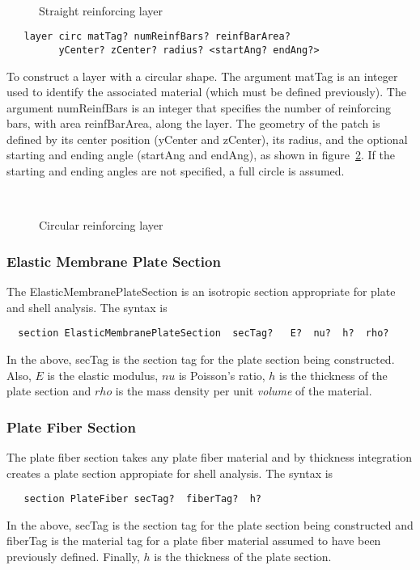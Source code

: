 \documentclass[12pt]{article}
\begin{document}
\begin{figure}[htpb]
\begin{center}
\leavevmode
\hbox{%
}
\end{center}
\caption{Straight reinforcing layer}
\label{straightLayer}
\end{figure}




{\sf\small
\begin{verbatim}
   layer circ matTag? numReinfBars? reinfBarArea? 
         yCenter? zCenter? radius? <startAng? endAng?>
\end{verbatim}
}

\noindent To construct a layer with a circular shape. The
argument matTag is an integer used to identify the associated
material (which must be defined previously). The argument 
numReinfBars is an integer that specifies the number of reinforcing 
bars, with area reinfBarArea, along the layer. 
The geometry of the patch is defined by its center position
(yCenter and zCenter), its radius, and the optional starting and ending angle 
(startAng and endAng), as shown in figure~\ref{circLayer}. If
the starting and ending angles are not specified, a full circle
is assumed.


\begin{figure}[htpb]
\begin{center}
\leavevmode
\hbox{%
}
\end{center}
\caption{Circular reinforcing layer}
\label{circLayer}
\end{figure}


\subsubsection{Elastic Membrane Plate Section}
The ElasticMembranePlateSection
is an isotropic section appropriate for plate and shell analysis.
The syntax is
{\sf\small
\begin{verbatim}
  section ElasticMembranePlateSection  secTag?   E?  nu?  h?  rho?
\end{verbatim}
}
In the above, secTag is the section tag for the plate section 
being constructed. Also, 
$E$ is the elastic modulus, $nu$ is Poisson's ratio, 
$h$ is the thickness of the plate section and
$rho$ is the mass density per unit {\em volume} of the material.


\subsubsection{Plate Fiber Section}
The plate fiber section takes any plate fiber material and by 
thickness integration creates a plate section appropiate for shell analysis.
The syntax is
{\sf\small
\begin{verbatim}
   section PlateFiber secTag?  fiberTag?  h?
\end{verbatim}
}
In the above, secTag is the section tag for the plate section 
being constructed and fiberTag is the material tag for a plate
fiber material assumed to have been previously defined. Finally,
$h$ is the thickness of the plate section.
\end{document}
